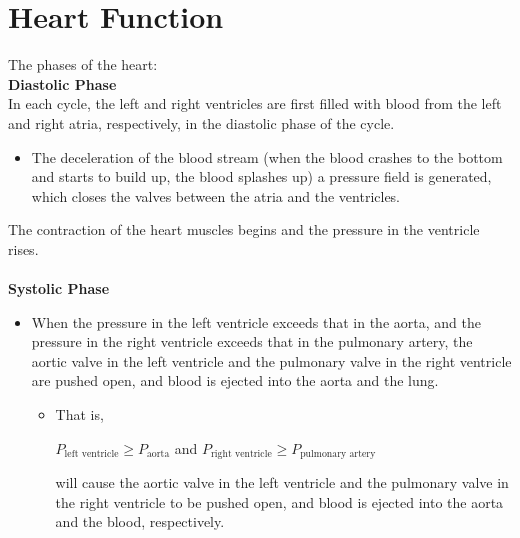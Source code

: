 \documentclass[12pt, a4paper]{article}
\theoremstyle{definition}
\theoremstyle{remark}
\theoremstyle{definition}
\newcommand{\?}{\stackrel{?}{=}}
\renewcommand{\bf}[1]{\textbf{#1}}
\begin{document}
\section{Heart Function}
The phases of the heart:\\
 \bf{Diastolic Phase}\\
In each cycle, the left and right ventricles are first filled with blood from the left and right atria, respectively, in the diastolic phase of the cycle. 
\begin{itemize}
\item The deceleration of the blood stream (when the blood crashes to the bottom and starts to build up, the blood splashes up) a pressure field is generated, which closes the valves between the atria and the ventricles. \\
\end{itemize}
The contraction of the heart muscles begins and the pressure in the ventricle rises. \\ \\
\noindent \bf{Systolic Phase}
\begin{itemize}
\item When the pressure in the left ventricle exceeds that in the aorta, and the pressure in the right ventricle exceeds that in the pulmonary artery, the aortic valve in the left ventricle and the pulmonary valve in the right ventricle are pushed open, and blood is ejected into the aorta and the lung.
\vspace{0.1in}
\begin{itemize}
	\item That is, 
	\vspace{-0.15in}
	\begin{center}
	${P}_{\text{left ventricle}} \geq {P}_{\text{aorta}}$ and ${P}_{\text{right ventricle}} \geq {P}_{\text{pulmonary 			artery}}$
	\end{center}
	will cause the aortic valve in the left ventricle and the pulmonary valve in the right ventricle to be pushed open, 	and blood is ejected into the aorta and the blood, respectively. \\
	\end{itemize}
\end{itemize}


\iffalse
\begin{wrapfigure}{r}{0.5\textwidth}
\vspace{-0.45in}
\begin{center}
    \texttt{[image: pressure]}
  \end{center}
  \vspace{-0.2in}
  \caption{Systolic and Diastolic Phases}
  \vspace{-9pt}
\end{wrapfigure}
\fi
\end{document}
